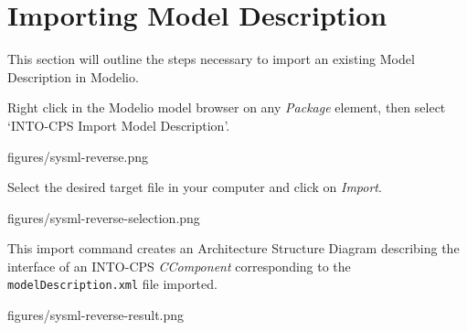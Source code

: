 \documentclass[11pt,a4paper]{../tutorial}
\begin{document}
\section{Importing Model Description}

This section will outline the steps necessary to import an existing Model Description in Modelio.

\begin{instructions}

\item Right click in the Modelio model browser on any \textit{Package} element, then select `INTO-CPS \menusep Import Model Description'.

\begin{center}
\begin{annotation}[width=0.7\linewidth]{figures/sysml-reverse.png}
    \end{annotation}
\end{center}

\item  Select the desired target  file in your computer and click on \textit{Import}.

\begin{center}
\begin{annotation}[width=0.7\linewidth]{figures/sysml-reverse-selection.png}
    \end{annotation}
\end{center}

This import command creates an Architecture Structure Diagram describing the interface of an INTO-CPS \emph{CComponent} corresponding to the \texttt{model\allowbreak{}Des\-crip\-tion\allowbreak{}.xml} file imported.

\begin{center}
\begin{annotation}[width=0.7\linewidth]{figures/sysml-reverse-result.png}
    \end{annotation}
\end{center}
\end{instructions}
\end{document}
